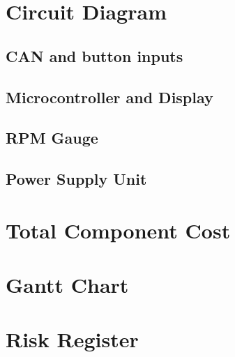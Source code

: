 \documentclass[a4paper,12pt]{article}
\begin{document}

\newpage




\begin{appendices}

\section{Circuit Diagram}
\label{app:circuit_diagram}

\subsection{CAN and button inputs}
\label{app:can}


\subsection{Microcontroller and Display}
\label{app:microcontroller}


\subsection{RPM Gauge}
\label{app:leds}


\subsection{Power Supply Unit}
\label{app:psu}


\section{Total Component Cost}
\label{app:cost}


\section{Gantt Chart}
\label{app:gantt_chart}
\vspace{-2.5cm}


\section{Risk Register}
\label{app:risk_register}


\end{appendices}

\end{document}
